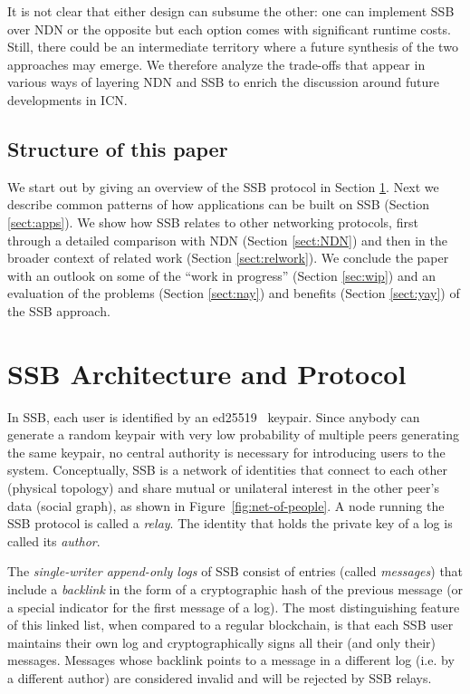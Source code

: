 \documentclass[9pt,sigconf]{acmart}
\begin{document}
It is not clear that either design can subsume the other: one can
implement SSB over NDN or the opposite but each option comes with
significant runtime costs. Still, there could be an intermediate
territory where a future synthesis of the two approaches may
emerge. We therefore analyze the trade-offs that appear in various
ways of layering NDN and SSB to enrich the discussion around future
developments in ICN.

\subsection*{Structure of this paper}

We start out by giving an overview of the SSB protocol in Section
\ref{sect:architecture}. Next we describe common patterns of how
applications can be built on SSB (Section \ref{sect:apps}). We show
how SSB relates to other networking protocols, first through a
detailed comparison with NDN (Section \ref{sect:NDN}) and then in the
broader context of related work (Section \ref{sect:relwork}). We
conclude the paper with an outlook on some of the ``work in progress''
(Section \ref{sec:wip}) and an evaluation of the problems (Section
\ref{sect:nay}) and benefits (Section \ref{sect:yay}) of the SSB
approach.



\section{SSB Architecture and Protocol}
\label{sect:architecture}

In SSB, each user is identified by an ed25519~\cite{bernstein2012high}
keypair. Since anybody can generate a random keypair with very low
probability of multiple peers generating the same keypair, no central
authority is necessary for introducing users to the
system. Conceptually, SSB is a network of identities that connect to
each other (physical topology) and share mutual or unilateral interest
in the other peer's data (social graph), as shown in
Figure~\ref{fig:net-of-people}. A node running the SSB protocol is
called a \textit{relay}. The identity that holds the private key of a
log is called its \textit{author}.

The {\em single-writer append-only logs} of SSB consist of entries
(called \textit{messages}) that include a {\em backlink} in the form
of a cryptographic hash of the previous message (or a special
indicator for the first message of a log). The most distinguishing
feature of this linked list, when compared to a regular blockchain, is
that each SSB user maintains their own log and cryptographically signs
all their (and only their) messages. Messages whose backlink points to
a message in a different log (i.e. by a different author) are
considered invalid and will be rejected by SSB relays.
\end{document}
